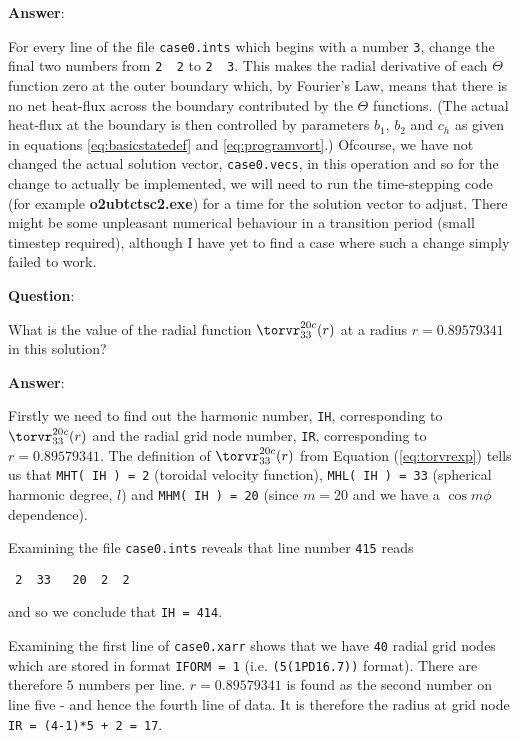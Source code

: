 {\bf Answer}: \newline

For every line of the file 
\verb+case0.ints+ which begins with a number
\verb+3+, change the final two numbers from
\verb+2  2+ to
\verb+2  3+. This makes the radial derivative of
each $\Theta$ function zero at the outer boundary
which, by Fourier's Law, means that there is no
net heat-flux across the boundary contributed by
the $\Theta$ functions. (The actual heat-flux at
the boundary is then controlled by parameters
$b_1$, $b_2$ and $c_h$ as given in equations
\ref{eq:basicstatedef} and
\ref{eq:programvort}.)
Ofcourse, we have not changed the actual
solution vector, \verb+case0.vecs+, in this
operation and so for the change to actually
be implemented, we will need to run the time-stepping
code (for example {\bf o2ubtctsc2.exe}) for a time
for the solution vector to adjust. There might be some
unpleasant numerical behaviour in a transition period
(small timestep required), although I have yet to find
a case where such a change simply failed to work. \newline

{\bf Question}: \newline

What is the value of the radial function
$\torvr_{33}^{20c}(r)$ at a radius $r = 0.89579341$
in this solution? \newline

{\bf Answer}: \newline

Firstly we need to find out the harmonic number,
\verb+IH+, corresponding to $\torvr_{33}^{20c}(r)$
and the radial grid node number, \verb+IR+, corresponding to 
$r = 0.89579341$.
The definition of $\torvr_{33}^{20c}(r)$ from
Equation (\ref{eq:torvrexp}) tells us that
\verb+MHT( IH ) = 2+ (toroidal velocity function),
\verb+MHL( IH ) = 33+ (spherical harmonic degree, $l$)
and \verb+MHM( IH ) = 20+ (since $m = 20$ and we have a
$\cos m \phi$ dependence).

Examining the file \verb+case0.ints+ reveals that
line number \verb+415+ reads
\begin{verbatim}
 2  33   20  2  2
\end{verbatim}
and so we conclude that \verb+IH = 414+.

Examining the first line of \verb+case0.xarr+
shows that we have \verb+40+ radial grid nodes which
are stored in format \verb+IFORM = 1+ (i.e.
\verb+(5(1PD16.7))+ format).
There are therefore $5$ numbers per line.
$r = 0.89579341$ is found as the second number on line
five - and hence the fourth line of data.
It is therefore the radius at grid node
\verb.IR = (4-1)*5 + 2 = 17..


